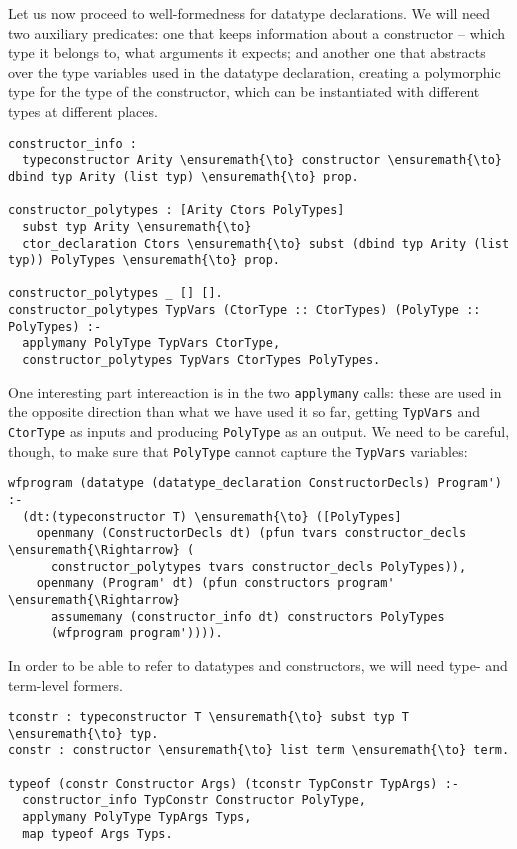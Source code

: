 Let us now proceed to well-formedness for datatype declarations. We will
need two auxiliary predicates: one that keeps information about a
constructor -- which type it belongs to, what arguments it expects; and
another one that abstracts over the type variables used in the datatype
declaration, creating a polymorphic type for the type of the
constructor, which can be instantiated with different types at different
places.

\begin{verbatim}
constructor_info :
  typeconstructor Arity \ensuremath{\to} constructor \ensuremath{\to} dbind typ Arity (list typ) \ensuremath{\to} prop.

constructor_polytypes : [Arity Ctors PolyTypes]
  subst typ Arity \ensuremath{\to}
  ctor_declaration Ctors \ensuremath{\to} subst (dbind typ Arity (list typ)) PolyTypes \ensuremath{\to} prop.

constructor_polytypes _ [] [].
constructor_polytypes TypVars (CtorType :: CtorTypes) (PolyType :: PolyTypes) :-
  applymany PolyType TypVars CtorType,
  constructor_polytypes TypVars CtorTypes PolyTypes.
\end{verbatim}

One interesting part intereaction is in the two \texttt{applymany}
calls: these are used in the opposite direction than what we have used
it so far, getting \texttt{TypVars} and \texttt{CtorType} as inputs and
producing \texttt{PolyType} as an output. We need to be careful, though,
to make sure that \texttt{PolyType} cannot capture the \texttt{TypVars}
variables:

\begin{verbatim}
wfprogram (datatype (datatype_declaration ConstructorDecls) Program') :-
  (dt:(typeconstructor T) \ensuremath{\to} ([PolyTypes]
    openmany (ConstructorDecls dt) (pfun tvars constructor_decls \ensuremath{\Rightarrow} (
      constructor_polytypes tvars constructor_decls PolyTypes)),
    openmany (Program' dt) (pfun constructors program' \ensuremath{\Rightarrow}
      assumemany (constructor_info dt) constructors PolyTypes
      (wfprogram program')))).
\end{verbatim}

In order to be able to refer to datatypes and constructors, we will need
type- and term-level formers.

\begin{verbatim}
tconstr : typeconstructor T \ensuremath{\to} subst typ T \ensuremath{\to} typ.
constr : constructor \ensuremath{\to} list term \ensuremath{\to} term.

typeof (constr Constructor Args) (tconstr TypConstr TypArgs) :-
  constructor_info TypConstr Constructor PolyType,
  applymany PolyType TypArgs Typs,
  map typeof Args Typs.
\end{verbatim}

